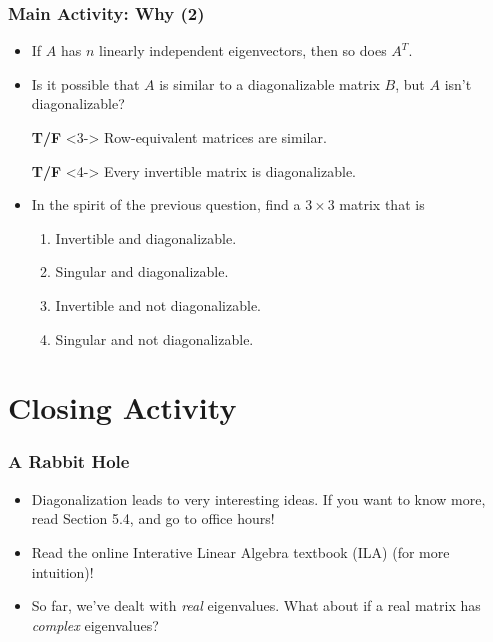 \documentclass{beamer}
\begin{document}
		\begin{frame}
			\frametitle{Main Activity: Why (2)}
			\begin{itemize}
				\item<1-> If \(A\) has \(n\) linearly independent eigenvectors, then so does \(A^T\).
				\item<2-> Is it possible that \(A\) is similar to a diagonalizable matrix \(B\), but \(A\) isn't diagonalizable?
				\item[\textbf{T/F}]<3-> Row-equivalent matrices are similar.
				\item[\textbf{T/F}]<4-> Every invertible matrix is diagonalizable.
				\item<5-> In the spirit of the previous question, find a \(3 \times 3\) matrix that is
						\begin{enumerate}
							\item<6-> Invertible and diagonalizable.
							\item<7-> Singular and diagonalizable.
							\item<8-> Invertible and not diagonalizable.
							\item<9-> Singular and not diagonalizable.
						\end{enumerate} 
			\end{itemize}
		\end{frame}
	\section{Closing Activity}
		\begin{frame}
			\frametitle{A Rabbit Hole}
			\begin{itemize}
				\item<1-> Diagonalization leads to very interesting ideas. If you want to know more, read Section 5.4, and go to office hours!
				\item<2-> Read the online Interative Linear Algebra textbook (ILA) (for more intuition)!
				\item<3-> So far, we've dealt with \emph{real} eigenvalues. What about if a real matrix has \emph{complex} eigenvalues?
			\end{itemize} \pause
		\end{frame}
\end{document}

